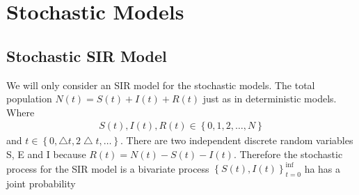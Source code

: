 %
%
%
%
%
%
%
\section{Stochastic Models}
\subsection{ Stochastic SIR Model}
We will only consider an SIR model for the stochastic models. The total population $N(t) = S(t)  + I(t) + R(t)$ just as in deterministic models. Where 
\begin{align}
S(t), I(t), R(t) \in \left\lbrace 0,1,2,\dots , N \right\rbrace 
\end{align}
and $t \in \left\lbrace 0,\bigtriangleup t ,2 \bigtriangleup t, \dots \right\rbrace$. There are two independent discrete random variables  S, E and I because $R(t) = N(t) -S(t) -I(t)$. Therefore the stochastic process for the SIR model is a bivariate process $\left\lbrace S(t), I(t) \right \rbrace^{\inf}_{t =0}$ ha has a joint probability 

